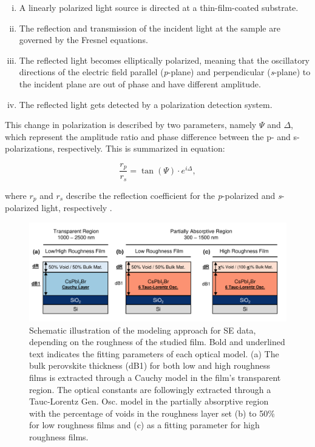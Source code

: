 \begin{enumerate}[i.]
  \item A linearly polarized light source is directed at a thin-film-coated substrate.
  \item The reflection and transmission of the incident light at the sample are governed by the Fresnel equations.
  \item The reflected light becomes elliptically polarized, meaning that the oscillatory directions of the electric field parallel (\textit{p}-plane) and perpendicular (\textit{s}-plane) to the incident plane are out of phase and have different amplitude.
  \item The reflected light gets detected by a polarization detection system.
\end{enumerate}

This change in polarization is described by two parameters, namely $\Psi$ and $\Delta$, which represent the amplitude ratio and phase difference between the p- and s-polarizations, respectively. This is summarized in equation: 

\begin{equation}
\frac{r_p}{r_s} = \tan(\Psi) \cdot e^{i\Delta},
\label{eq:ellipsometry}
\end{equation}

where $r_p$ and $r_s$ describe the reflection coefficient for the \textit{p}-polarized and \textit{s}-polarized light, respectively \cite{Fujiwara2018SpectroscopicCharacterization}.

\begin{figure}{}
  \centering
  \medskip
  \includegraphics[width=.95\textwidth]{chapters/ellipsometry/image/Model_Approach.pdf}
  \caption{Schematic illustration of the modeling approach for SE data, depending on the roughness of the studied film. Bold and underlined text indicates the fitting parameters of each optical model. (a) The bulk perovskite thickness (dB1) for both low and high roughness films is extracted through a Cauchy model in the film's transparent region. The optical constants are followingly extracted through a Tauc-Lorentz Gen. Osc. model in the partially absorptive region with the percentage of voids in the roughness layer set (b) to 50\% for low roughness films and (c) as a fitting parameter for high roughness films.}
  \label{fig:ellipsometry:static_models}
\end{figure}

